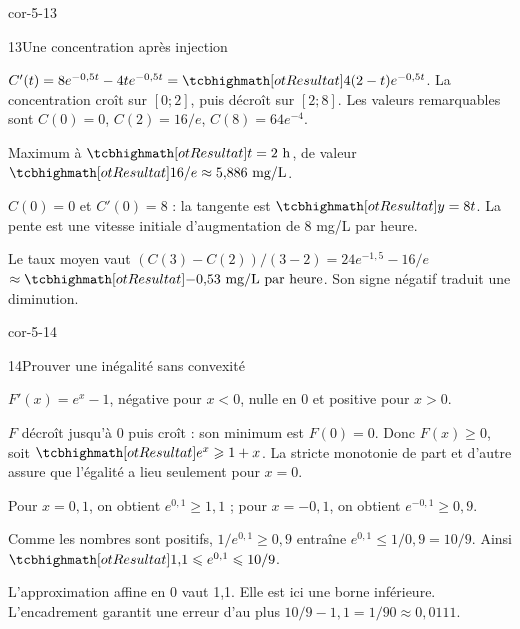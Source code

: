 \begin{blocLivre}{cor-5-13}
\begin{corrige}{13}{Une concentration après injection}
\begin{questions}
\item $C'(t)=8e^{-0{,}5t}-4te^{-0{,}5t}=\res{4(2-t)e^{-0{,}5t}}$.
La concentration croît sur $[0;2]$, puis décroît sur $[2;8]$.
Les valeurs remarquables sont $C(0)=0$, $C(2)=16/e$, $C(8)=64e^{-4}$.
\item Maximum à $\res{t=2\text{ h}}$, de valeur $\res{16/e\approx5{,}886\text{ mg/L}}$.
\item $C(0)=0$ et $C'(0)=8$ : la tangente est $\res{y=8t}$.
La pente est une vitesse initiale d'augmentation de 8 mg/L par heure.
\item Le taux moyen vaut $(C(3)-C(2))/(3-2)=24e^{-1{,}5}-16/e$
$\approx\res{-0{,}53\text{ mg/L par heure}}$. Son signe négatif traduit une diminution.
\end{questions}
\label{figlivre-r05-13-var-cor}

\label{figlivre-r05-13-concentration-cor}

\end{corrige}
\end{blocLivre}
\begin{blocLivre}{cor-5-14}
\begin{corrige}{14}{Prouver une inégalité sans convexité}
\begin{questions}
\item $F'(x)=e^x-1$, négative pour $x<0$, nulle en 0 et positive pour $x>0$.
\item $F$ décroît jusqu'à 0 puis croît : son minimum est $F(0)=0$.
Donc $F(x)\geq0$, soit $\res{e^x\geq1+x}$.
La stricte monotonie de part et d'autre assure que l'égalité a lieu seulement pour $x=0$.
\item Pour $x=0{,}1$, on obtient $e^{0{,}1}\geq1{,}1$ ; pour $x=-0{,}1$,
on obtient $e^{-0{,}1}\geq0{,}9$.
\item Comme les nombres sont positifs, $1/e^{0{,}1}\geq0{,}9$ entraîne
$e^{0{,}1}\leq1/0{,}9=10/9$. Ainsi $\res{1{,}1\leq e^{0{,}1}\leq10/9}$.
\item L'approximation affine en 0 vaut 1,1. Elle est ici une borne inférieure.
L'encadrement garantit une erreur d'au plus $10/9-1{,}1=1/90\approx0{,}0111$.
\end{questions}
\label{figlivre-r05-14-var-cor}

\label{figlivre-r05-14-inegalite-cor}

\end{corrige}
\end{blocLivre}
